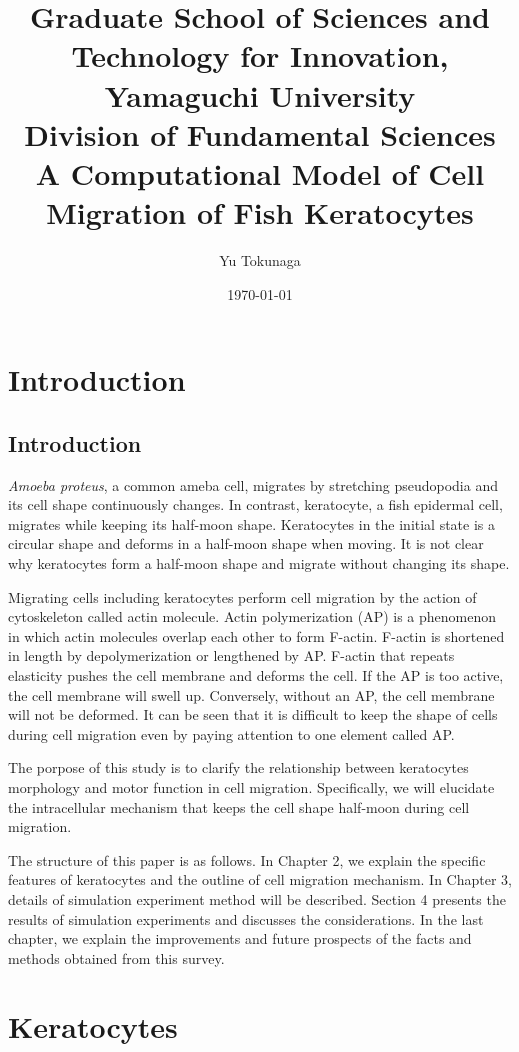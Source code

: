 \documentclass[a4paper,12pt]{book}
\title{\Large Graduate School of Sciences and Technology for Innovation, Yamaguchi University\\[1cm]
Division of Fundamental Sciences\\[3cm]
\huge A Computational Model of Cell Migration of Fish Keratocytes\\[5cm]
}
\author{Yu Tokunaga}
\date{\Large \today}
\begin{document}
\maketitle
\setcounter{page}{1}
\tableofcontents
\chapter{Introduction}
\setcounter{page}{1}
\section{Introduction}
{\it Amoeba proteus}, a common ameba cell, migrates by stretching pseudopodia and its cell shape continuously changes.
In contrast, keratocyte, a fish epidermal cell, migrates while keeping its half-moon shape.
Keratocytes in the initial state is a circular shape and deforms in a half-moon shape when moving.
It is not clear why keratocytes form a half-moon shape and migrate without changing its shape.

Migrating cells including keratocytes perform cell migration by the action of cytoskeleton called actin molecule. 
Actin polymerization (AP) is a phenomenon in which actin molecules overlap each other to form F-actin. 
F-actin is shortened in length by depolymerization or lengthened by AP.
F-actin that repeats elasticity pushes the cell membrane and deforms the cell.
If the AP is too active, the cell membrane will swell up.
Conversely, without an AP, the cell membrane will not be deformed.
It can be seen that it is difficult to keep the shape of cells during cell migration even by paying attention to one element called AP.

The porpose of this study is to clarify the relationship between keratocytes morphology and motor function in cell migration. Specifically, we will elucidate the intracellular mechanism that keeps the cell shape half-moon during cell migration.

The structure of this paper is as follows. In Chapter 2, we explain the specific features of keratocytes and the outline of cell migration mechanism. In Chapter 3, details of simulation experiment method will be described. Section 4 presents the results of simulation experiments and discusses the considerations. In the last chapter, we explain the improvements and future prospects of the facts and methods obtained from this survey.

\chapter{Keratocytes}
\end{document}
